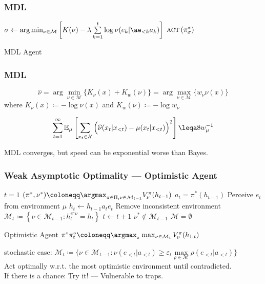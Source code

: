 \documentclass[UTF8,11pt,colorlinks,compress,openany]{beamer}%
\begin{document}
\begin{frame}\frametitle{MDL}
\begin{algorithm}[H]
\begin{algorithmic}[1]
\Loop
\State $\sigma\gets\arg\min_{\nu\in\mathcal{M}}\left[K(\nu) - \lambda\sum\limits_{k=1}^{t}\log\nu(e_k\lvert\ae_{<k}a_k)\right]$
\State $\textsc{act}\left(\pi_{\sigma}^*\right)$
\EndLoop
\end{algorithmic}
\caption{MDL Agent}\label{alg:mdl}
\end{algorithm}
\end{frame}

\begin{frame}\frametitle{MDL}
	\setlength\abovedisplayskip{0pt}
	\setlength\belowdisplayskip{0pt}
	\begin{definition}[MDL]
		\[ \widehat{\nu}=\arg\min\limits_{\nu\in\mathcal{M}}\{K_\nu(x)+K_w(\nu)\}=\arg\max\limits_{\nu\in\mathcal{M}}\{w_\nu \nu(x)\}\]
		where $K_\nu(x)\coloneqq -\log\nu(x)$ and $K_w(\nu)\coloneqq -\log w_\nu$
	\end{definition}
	\begin{theorem}
		\begin{gather*}
		\sum\limits_{t=1}^\infty\mathbb{E}_\mu\left[\sum\limits_{x_t\in\mathcal{X}}\Big(\widehat{\nu}(x_t|x_{<t})-\mu(x_t|x_{<t})\Big)^2\right]
		\leqa 8w_\mu^{-1}
		\end{gather*}
	\end{theorem}
	MDL converges, but speed can be exponential worse than Bayes.
\end{frame}

\begin{frame}\frametitle{Weak Asymptotic Optimality --- Optimistic Agent}\vspace{-1ex}
\begin{algorithm}[H]
\begin{algorithmic}[1]
\State $t=1$
\Repeat
\State $(\pi^*,\nu^*)\coloneqq \argmax_{\pi\in\Pi,\nu\in\mathcal{M}_{t-1}}V_\nu^\pi(h_{t-1})$
 \Repeat
 \State $a_t=\pi^*(h_{t-1})$
 \State Perceive $e_t$ from environment $\mu$
 \State $h_t\gets h_{t-1}a_te_t$
 \State Remove inconsistent environment $\mathcal{M}_t\coloneqq \left\{\nu\in\mathcal{M}_{t-1}: h_t^{\pi^\circ\nu}=h_t\right\}$
 \State $t\gets t+1$
 \Until $\nu^*\notin\mathcal{M}_{t-1}$
\Until $\mathcal{M}=\emptyset$
\end{algorithmic}
\caption{Optimistic Agent $\pi^\circ \hfill \pi_t^\circ\coloneqq \argmax_\pi\max_{\nu\in\mathcal{M}_t} V_\nu^\pi(h_{1:t})$}\label{alg:optimistic}
\end{algorithm}\vspace{-1ex}
	stochastic case: $\mathcal{M}_t\coloneqq \Big\{\nu\in\mathcal{M}_{t-1}: \nu(e_{<t}|a_{<t})\geq\varepsilon_t\max\limits_{\rho\in\mathcal{M}}\rho(e_{<t}|a_{<t})\Big\}$\\
	Act optimally w.r.t. the most optimistic environment until contradicted.\\
	If there is a chance: Try it! --- Vulnerable to traps.
\end{frame}
\end{document}
